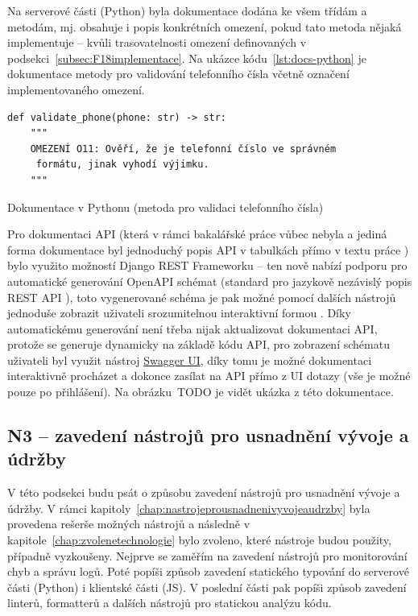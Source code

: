 Na serverové části (Python) byla dokumentace dodána ke všem třídám a metodám, mj. obsahuje i popis konkrétních omezení, pokud tato metoda nějaká implementuje -- kvůli trasovatelnosti omezení definovaných v podsekci~\ref{subsec:F18implementace}. Na ukázce kódu~\ref{lst:docs-python} je dokumentace metody pro validování telefonního čísla včetně označení implementovaného omezení.

\begin{listing}[ht]
	\begin{verbatim}
def validate_phone(phone: str) -> str:
    """
    OMEZENÍ O11: Ověří, že je telefonní číslo ve správném
     formátu, jinak vyhodí výjimku.
    """
	\end{verbatim}
	\caption{Dokumentace v Pythonu (metoda pro validaci telefonního čísla)}\label{lst:docs-python}
\end{listing}

Pro dokumentaci API (která v rámci bakalářské práce vůbec nebyla a jediná forma dokumentace byl jednoduchý popis API v tabulkách přímo v textu práce \cite{bp}) bylo využito možností Django REST Frameworku -- ten nově nabízí podporu pro automatické generování OpenAPI schémat (standard pro jazykově nezávislý popis REST API \cite{openapi}), toto vygenerované schéma je pak možné pomocí dalších nástrojů jednoduše zobrazit uživateli srozumitelnou interaktivní formou \cite{drf-openapi}. Díky automatickému generování není třeba nijak aktualizovat dokumentaci API, protože se generuje dynamicky na základě kódu API, pro zobrazení schématu uživateli byl využit nástroj \href{https://swagger.io/tools/swagger-ui/}{Swagger UI}, díky tomu je možné dokumentaci interaktivně procházet a dokonce zasílat na API přímo z UI dotazy (vše je možné pouze po přihlášení). Na obrázku~TODO je vidět ukázka z této dokumentace.

\subsection{N3 -- zavedení nástrojů pro usnadnění vývoje a údržby}\label{subsec:N3implementace}

V této podsekci budu psát o způsobu zavedení nástrojů pro usnadnění vývoje a údržby. V rámci kapitoly~\ref{chap:nastrojeprousnadnenivyvojeaudrzby} byla provedena rešerše možných nástrojů a následně v kapitole~\ref{chap:zvolenetechnologie} bylo zvoleno, které nástroje budou použity, případně vyzkoušeny. Nejprve se zaměřím na zavedení nástrojů pro monitorování chyb a správu logů. Poté popíši způsob zavedení statického typování do serverové části (Python) i klientské části (JS). V poslední části pak popíši způsob zavedení linterů, formatterů a dalších nástrojů pro statickou analýzu kódu.

